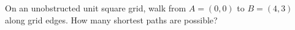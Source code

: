 On an unobstructed unit square grid, walk from $A=(0,0)$ to $B=(4,3)$ along grid edges. How many shortest paths are possible?
